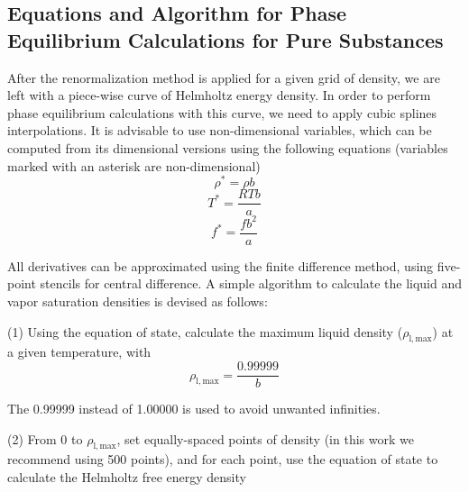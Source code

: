 \documentclass[preprint,12pt,3p]{elsarticle}
\begin{document}
\nomenclature[L]{}{}
\nomenclature[L]{}{}
\nomenclature[L]{}{}
\nomenclature[L]{}{}
\nomenclature[L]{}{}
\printnomenclature[5em]

\begin{appendices}
\renewcommand{\theequation}{\thesection.\arabic{equation}}
\setcounter{equation}{0}
\section{Equations and Algorithm for Phase Equilibrium Calculations for Pure Substances}
\label{app:pure substances}

After the renormalization method is applied for a given grid of density, we are left with a piece-wise curve of Helmholtz energy density.
In order to perform phase equilibrium calculations with this curve, we need to apply cubic splines interpolations.
It is advisable to use non-dimensional variables, which can be computed from its dimensional versions using the following equations (variables marked with an asterisk are non-dimensional)
\begin{equation} \label{eq:adim_dens}
\rho^{*} = \rho b
\end{equation}
\begin{equation} \label{eq:adim_T}
T^{*} = \frac{RTb}{a}
\end{equation}
\begin{equation} \label{eq:adim_f}
f^{*} = \frac{fb^{2}}{a}
\end{equation}

All derivatives can be approximated using the finite difference method, using five-point stencils for central difference.
A simple algorithm to calculate the liquid and vapor saturation densities is devised as follows:

(1) Using the equation of state, calculate the maximum liquid density ($\rho_\mathrm{l,max}$) at a given temperature, with
\begin{equation} \label{eq:max_dens}
\rho_\mathrm{l,max} = \frac{0.99999}{b}
\end{equation}

The 0.99999 instead of 1.00000 is used to avoid unwanted infinities.

(2) From 0 to $\rho_\mathrm{l,max}$, set equally-spaced points of density (in this work we recommend using 500 points), and for each point, use the equation of state to calculate the Helmholtz free energy density


\end{appendices}
\end{document}
